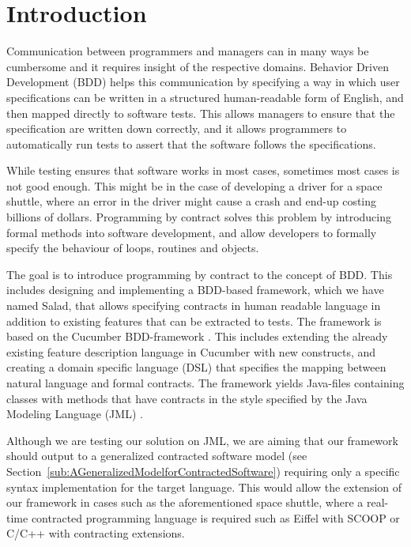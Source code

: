 \section{Introduction} %

Communication between programmers and managers can in many ways be cumbersome and it requires insight of the respective domains.
Behavior Driven Development (BDD) helps this communication by specifying a way in which user specifications can be written in a structured human-readable form of English, and then mapped directly to software tests.
This allows managers to ensure that the specification are written down correctly, and it allows programmers to automatically run tests to assert that the software follows the specifications. 

While testing ensures that software works in most cases, sometimes most cases is not good enough. This might be in the case of developing a driver for a 
space shuttle, where an error in the driver might cause a crash and end-up costing billions of dollars.
Programming by contract \cite{meyer1992} solves this problem by introducing formal methods into software development, 
and allow developers to formally specify the behaviour of loops, routines and objects.

The goal is to introduce programming by contract to the concept of BDD. This includes designing and implementing a BDD-based framework,
which we have named Salad, that allows specifying contracts in human readable language in addition to existing features that can be extracted to tests.
The framework is based on the Cucumber BDD-framework \cite{hellesoy2012}.
This includes extending the already existing feature description language in Cucumber with new constructs, 
and creating a domain specific language (DSL) that specifies the mapping between natural language and formal contracts.
The framework yields Java-files containing classes with methods that have contracts in the style specified by the Java Modeling Language (JML) \cite{leavens2006design}.

Although we are testing our solution on JML, we are aiming that our framework should output to a generalized contracted software model (see Section~\ref{sub:AGeneralizedModelforContractedSoftware}) requiring
only a specific syntax implementation for the target language. This would allow the extension of our framework in cases such as the aforementioned space shuttle,
where a real-time contracted programming language is required such as Eiffel with SCOOP\cite{eiffel2012scoop} or C/C++ with contracting extensions\cite{digitalmars2011contractprogramming}.

